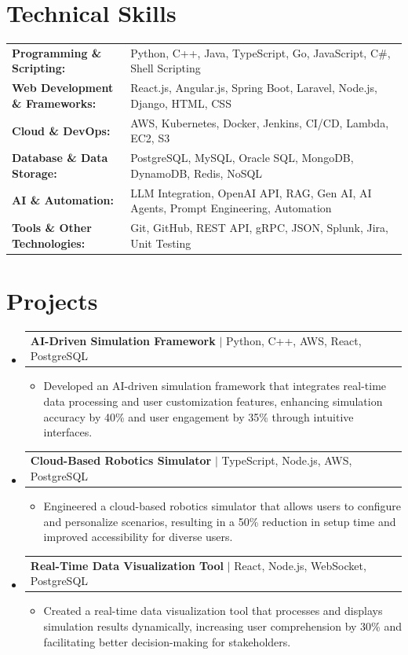 \documentclass[letterpaper,10pt]{article}
\makeatletter
\newcommand{\resumeItem}[1]{
  \item{\fontsize{8pt}{9pt}\selectfont
    #1 \vspace{-3pt}
  }
}
\newcommand{\resumeProjectHeading}[2]{
    \item
    \begin{tabular*}{1.001\textwidth}{l@{\extracolsep{\fill}}r}
      \fontsize{8.5pt}{10pt}#1 & \textbf{\fontsize{8.5pt}{10pt} #2}\\
    \end{tabular*}\vspace{-7pt}
}
\newcommand{\resumeSubHeadingListStart}{\begin{itemize}[leftmargin=0pt, label={}]}
\newcommand{\resumeSubHeadingListEnd}{\end{itemize}}
\newcommand{\resumeItemListStart}{\begin{itemize}[leftmargin=*]}
\newcommand{\resumeItemListEnd}{\end{itemize}\vspace{-5pt}}
\makeatother
\begin{document}
\section{Technical Skills}
        \vspace{-14pt}
        \begin{table}[h]
            \fontsize{8pt}{9pt}\selectfont
            \begin{tabular}{p{0.3\linewidth} p{0.7\linewidth}}
                \textbf{Programming \& Scripting:} & Python, C++, Java, TypeScript, Go, JavaScript, C\#, Shell Scripting \\
                \textbf{Web Development \& Frameworks:} & React.js, Angular.js, Spring Boot, Laravel, Node.js, Django, HTML, CSS \\
                \textbf{Cloud \& DevOps:} & AWS, Kubernetes, Docker, Jenkins, CI/CD, Lambda, EC2, S3 \\
                \textbf{Database \& Data Storage:} & PostgreSQL, MySQL, Oracle SQL, MongoDB, DynamoDB, Redis, NoSQL \\
                \textbf{AI \& Automation:} & LLM Integration, OpenAI API, RAG, Gen AI, AI Agents, Prompt Engineering, Automation \\
                \textbf{Tools \& Other Technologies:} & Git, GitHub, REST API, gRPC, JSON, Splunk, Jira, Unit Testing \\
            \end{tabular}
        \end{table}
 \vspace{-18pt}

\section{Projects}
    \vspace{-5pt}
    \resumeSubHeadingListStart
          \resumeProjectHeading
            {\textbf{AI-Driven Simulation Framework} $|$ Python, C++, AWS, React, PostgreSQL}{}
            \resumeItemListStart
                \resumeItem{Developed an AI-driven simulation framework that integrates real-time data processing and user customization features, enhancing simulation accuracy by 40\% and user engagement by 35\% through intuitive interfaces.}
            \resumeItemListEnd
        \vspace{-12pt}
    
        \resumeProjectHeading
            {\textbf{Cloud-Based Robotics Simulator} $|$ TypeScript, Node.js, AWS, PostgreSQL}{}
        \resumeItemListStart
                \resumeItem{Engineered a cloud-based robotics simulator that allows users to configure and personalize scenarios, resulting in a 50\% reduction in setup time and improved accessibility for diverse users.}
        \resumeItemListEnd
      \vspace{-12pt}
      \resumeProjectHeading
        {\textbf{Real-Time Data Visualization Tool} $|$ React, Node.js, WebSocket, PostgreSQL}{}
    \resumeItemListStart
            \resumeItem{Created a real-time data visualization tool that processes and displays simulation results dynamically, increasing user comprehension by 30\% and facilitating better decision-making for stakeholders.}
    \resumeItemListEnd
    \resumeSubHeadingListEnd
\end{document}
